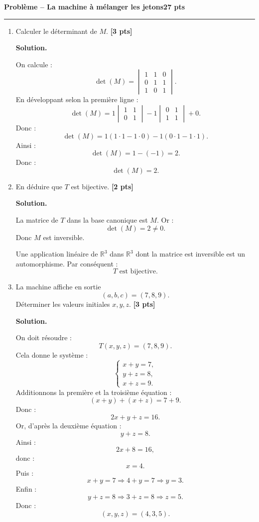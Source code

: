 \documentclass[11pt,a4paper]{article}
\newcommand{\pts}[1]{\hfill \textbf{[#1 pts]}}
\newcommand{\R}{\mathbb{R}}
\newcounter{probleme}
\newenvironment{probleme}[2]{
    \refstepcounter{probleme}
    \vspace{0.6cm}
    {\Large\color{bleu}\textbf{Problème \theprobleme{} -- #1}}\hfill \textbf{#2 pts}
    \par\medskip
    \hrule
    \medskip
}{\vspace{0.5cm}}
\newcommand{\solution}{
    \textbf{\color{bleu}Solution. }
}
\begin{document}
\begin{probleme}{La machine à mélanger les jetons}{27}
\begin{enumerate}
    \item Calculer le déterminant de \(M\). \pts{3}

    \solution

    On calcule :
    \[
    \det(M)=
    \begin{vmatrix}
    1&1&0\\
    0&1&1\\
    1&0&1
    \end{vmatrix}.
    \]
    En développant selon la première ligne :
    \[
    \det(M)
    =
    1
    \begin{vmatrix}
    1&1\\
    0&1
    \end{vmatrix}
    -
    1
    \begin{vmatrix}
    0&1\\
    1&1
    \end{vmatrix}
    +
    0.
    \]
    Donc :
    \[
    \det(M)
    =
    1(1\cdot 1-1\cdot 0)
    -
    1(0\cdot 1-1\cdot 1).
    \]
    Ainsi :
    \[
    \det(M)=1-(-1)=2.
    \]
    Donc :
    \[
    \boxed{\det(M)=2.}
    \]

    \item En déduire que \(T\) est bijective. \pts{2}

    \solution

    La matrice de \(T\) dans la base canonique est \(M\). Or :
    \[
    \det(M)=2\neq 0.
    \]
    Donc \(M\) est inversible.

    Une application linéaire de \(\R^3\) dans \(\R^3\) dont la matrice est inversible est un automorphisme. Par conséquent :
    \[
    \boxed{T\text{ est bijective}.}
    \]

    \item La machine affiche en sortie
    \[
    (a,b,c)=(7,8,9).
    \]
    Déterminer les valeurs initiales \(x,y,z\). \pts{3}

    \solution

    On doit résoudre :
    \[
    T(x,y,z)=(7,8,9).
    \]
    Cela donne le système :
    \[
    \begin{cases}
    x+y=7,\\
    y+z=8,\\
    x+z=9.
    \end{cases}
    \]
    Additionnons la première et la troisième équation :
    \[
    (x+y)+(x+z)=7+9.
    \]
    Donc :
    \[
    2x+y+z=16.
    \]
    Or, d'après la deuxième équation :
    \[
    y+z=8.
    \]
    Ainsi :
    \[
    2x+8=16,
    \]
    donc :
    \[
    x=4.
    \]
    Puis :
    \[
    x+y=7
    \Longrightarrow
    4+y=7
    \Longrightarrow
    y=3.
    \]
    Enfin :
    \[
    y+z=8
    \Longrightarrow
    3+z=8
    \Longrightarrow
    z=5.
    \]
    Donc :
    \[
    \boxed{(x,y,z)=(4,3,5).}
    \]


\end{enumerate}
\end{probleme}
\end{document}
